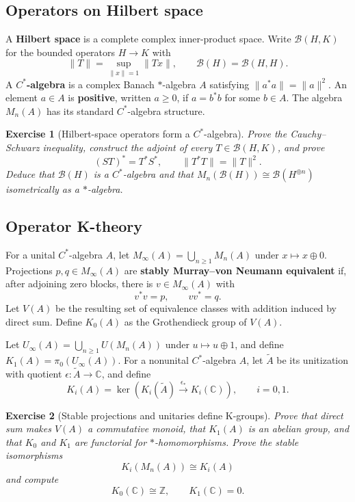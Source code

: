 \documentclass{article}
\newtheorem{exercise}{Exercise}
\begin{document}
\subsection{Operators on Hilbert space}

A \textbf{Hilbert space} is a complete complex inner-product space. Write
$\mathcal B(H,K)$ for the bounded operators $H\to K$ with
\[
\|T\|=\sup_{\|x\|=1}\|Tx\|,
\qquad
\mathcal B(H)=\mathcal B(H,H).
\]
A \textbf{$C^*$-algebra} is a complex Banach $*$-algebra $A$ satisfying
$\|a^*a\|=\|a\|^2$. An element $a\in A$ is \textbf{positive}, written
$a\geq0$, if $a=b^*b$ for some $b\in A$. The algebra $M_n(A)$ has its standard
$C^*$-algebra structure.

\begin{exercise}[Hilbert-space operators form a $C^*$-algebra]\leavevmode\par
\textit{Prove the Cauchy--Schwarz inequality, construct the adjoint of every
$T\in\mathcal B(H,K)$, and prove}
\[
(ST)^*=T^*S^*,
\qquad
\|T^*T\|=\|T\|^2.
\]
\textit{Deduce that $\mathcal B(H)$ is a $C^*$-algebra and that
$M_n(\mathcal B(H))\cong\mathcal B(H^{\oplus n})$ isometrically as a
$*$-algebra.}
\end{exercise}

\subsection{Operator K-theory}

For a unital $C^*$-algebra $A$, let
$M_\infty(A)=\bigcup_{n\geq1}M_n(A)$ under $x\mapsto x\oplus0$. Projections
$p,q\in M_\infty(A)$ are \textbf{stably Murray--von Neumann equivalent} if,
after adjoining zero blocks, there is $v\in M_\infty(A)$ with
\[
v^*v=p,
\qquad
vv^*=q.
\]
Let $V(A)$ be the resulting set of equivalence classes with addition induced
by direct sum. Define $K_0(A)$ as the Grothendieck group of $V(A)$.

Let $U_\infty(A)=\bigcup_{n\geq1}U(M_n(A))$ under $u\mapsto u\oplus1$, and
define $K_1(A)=\pi_0(U_\infty(A))$. For a nonunital $C^*$-algebra $A$, let
$\widetilde A$ be its unitization with quotient
$\epsilon:\widetilde A\to\mathbb C$, and define
\[
K_i(A)=
\ker\!\left(K_i(\widetilde A)\xrightarrow{\epsilon_*}K_i(\mathbb C)\right),
\qquad i=0,1.
\]

\begin{exercise}[Stable projections and unitaries define K-groups]
\leavevmode\par
\textit{Prove that direct sum makes $V(A)$ a commutative monoid, that $K_1(A)$
is an abelian group, and that $K_0$ and $K_1$ are functorial for
$*$-homomorphisms. Prove the stable isomorphisms}
\[
K_i(M_n(A))\cong K_i(A)
\]
\textit{and compute}
\[
K_0(\mathbb C)\cong\mathbb Z,
\qquad
K_1(\mathbb C)=0.
\]
\end{exercise}
\end{document}
